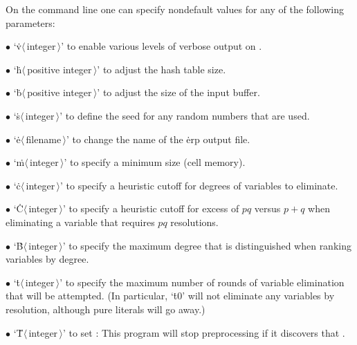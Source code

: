On the command line one can specify nondefault values for any of the
following parameters:
\smallskip
\item{$\bullet$}
`\.v$\langle\,$integer$\,\rangle$' to enable various levels of verbose
output on .
\item{$\bullet$}
`\.h$\langle\,$positive integer$\,\rangle$' to adjust the hash table size.
\item{$\bullet$}
`\.b$\langle\,$positive integer$\,\rangle$' to adjust the size of the input
buffer.
\item{$\bullet$}
`\.s$\langle\,$integer$\,\rangle$' to define the seed for any random numbers
that are used.
\item{$\bullet$}
`\.e$\langle\,$filename$\,\rangle$' to change the name
of the \.{erp} output file.
\item{$\bullet$}
`\.m$\langle\,$integer$\,\rangle$' to specify a minimum  size
(cell memory).
\item{$\bullet$}
`\.c$\langle\,$integer$\,\rangle$' to specify a heuristic cutoff for
degrees of variables to eliminate.
\item{$\bullet$}
`\.C$\langle\,$integer$\,\rangle$' to specify a heuristic cutoff for
excess of $pq$ versus $p+q$ when eliminating a variable that requires
$pq$ resolutions.
\item{$\bullet$}
`\.B$\langle\,$integer$\,\rangle$' to specify the maximum degree that is
distinguished when ranking variables by degree.
\item{$\bullet$}
`\.t$\langle\,$integer$\,\rangle$' to specify the maximum number of
rounds of variable elimination that will be attempted.
(In particular, `\.{t0}' will not eliminate any variables by resolution,
although pure literals will go away.)
\item{$\bullet$}
`\.T$\langle\,$integer$\,\rangle$' to set : This program will
stop preprocessing if it discovers that .

